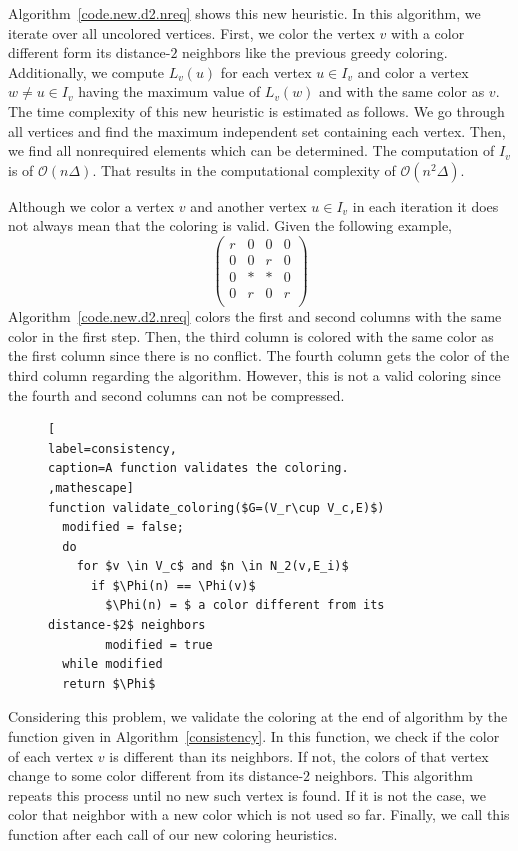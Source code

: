 \documentclass[12pt, twoside,a4paper,toc=bibliography]{scrbook}
\newcommand{\coderef}[1]{Algorithm~\protect\ref{#1}}
\newcommand{\nreq}{L}
\begin{document}
\coderef{code.new.d2.nreq} shows this new heuristic.
In this algorithm, we iterate over all uncolored vertices.
First, we color the vertex $v$ with a color different form
its distance-$2$ neighbors like the previous greedy coloring.
Additionally, we compute $\nreq_v(u)$ for each vertex $u\in I_v$
and color a vertex $w\neq u \in I_v$ having the maximum value of $\nreq_v(w)$
and with the same color as $v$.
The time complexity of this new heuristic is estimated as follows.
We go through all vertices
and find the maximum independent set containing each vertex.
Then, we find all nonrequired elements which can be determined.
The computation of $I_v$ is of $\mathcal{O}(n\Delta)$.
That results in the computational complexity of $\mathcal{O}(n^2\Delta)$.

Although we color a vertex $v$ and another vertex $u\in I_v$ in each iteration
it does not always mean that the coloring is valid. Given the following example,
\begin{equation}
\left(\begin{array}{cccc}
r & 0 & 0 & 0  \\
0 & 0 & r & 0 \\
0 & * & * & 0 \\
0 & r & 0 & r \\
\end{array}\right)
\label{twocolorings2}
\end{equation}
\coderef{code.new.d2.nreq} colors the first and second columns with the same color
in the first step. Then, the third column is colored with the same color as the
first column since there is no conflict. The fourth column gets the color of
the third column regarding the algorithm. However, this is not a valid coloring
since the fourth and second columns can not be compressed.
\begin{figure}
\begin{lstlisting}[
label=consistency,
caption=A function validates the coloring.
,mathescape]
function validate_coloring($G=(V_r\cup V_c,E)$)
  modified = false;
  do
    for $v \in V_c$ and $n \in N_2(v,E_i)$
      if $\Phi(n) == \Phi(v)$
        $\Phi(n) = $ a color different from its distance-$2$ neighbors
        modified = true
  while modified
  return $\Phi$
\end{lstlisting}
\end{figure}
Considering this problem, we validate the coloring at the end of algorithm
by the function given in \coderef{consistency}.
In this function, we check if the color of each vertex $v$ is different than its neighbors.
If not, the colors of that vertex change to some color different from its distance-$2$ neighbors.
This algorithm repeats this process until no new such vertex is found.
If it is not the case, we color that neighbor with a new color which is not used so far.
Finally, we call this function after each call of our new coloring heuristics.
\end{document}
